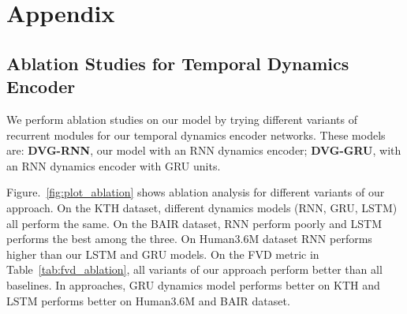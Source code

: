 \documentclass{article} \usepackage{iclr2021_conference,times}
\begin{document}



\clearpage

\appendix
{}

\section{Appendix}
\subsection{Ablation Studies for Temporal Dynamics Encoder}
We perform ablation studies on our model by trying different variants of recurrent modules for our temporal dynamics encoder networks. These models are: \textbf{DVG-RNN}, our model with an RNN dynamics encoder; \textbf{DVG-GRU}, with an RNN dynamics encoder with GRU units.

Figure.~\ref{fig:plot_ablation} shows ablation analysis for different variants of our approach. On the KTH dataset, different dynamics models (RNN, GRU, LSTM) all perform the same. On the BAIR dataset, RNN perform poorly and LSTM performs the best among the three. On Human3.6M dataset RNN performs higher than our LSTM and GRU models. On the FVD metric in Table~\ref{tab:fvd_ablation}, all variants of our approach perform better than all baselines. In approaches, GRU dynamics model performs better on KTH and LSTM performs better on Human3.6M and BAIR dataset.
\end{document}
